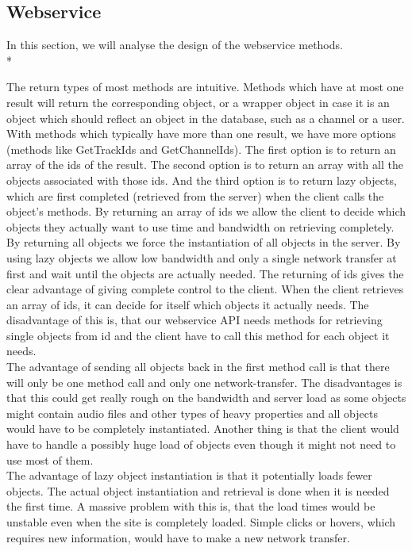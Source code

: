 \documentclass[a4paper,11pt,report]{article}
\begin{document}
\subsection{Webservice}
In this section, we will analyse the design of the webservice methods.  \\*

The return types of most methods are intuitive. Methods which have at most one result will return the corresponding object, or a wrapper object in case it is an object which should reflect an object in the database, such as a channel or a user. \\
With methods which typically have more than one result, we have more options (methods like GetTrackIds and GetChannelIds). 
The first option is to return an array of the ids of the result. The second option is to return an array with all the objects associated with those ids. And the third option is to return lazy objects, which are first completed (retrieved from the server) when the client calls the object's methods. By returning an array of ids we allow the client to decide which objects they actually want to use time and bandwidth on retrieving completely. By returning all objects we force the instantiation of all objects in the server. By using lazy objects we allow low bandwidth and only a single network transfer at first and wait until the objects are actually needed.
The returning of ids gives the clear advantage of giving complete control to the client. When the client retrieves an array of ids, it can decide for itself which objects it actually needs. The disadvantage of this is, that our webservice API needs methods for retrieving single objects from id and the client have to call this method for each object it needs. \\
The advantage of sending all objects back in the first method call is that there will only be one method call and only one network-transfer. The disadvantages is that this could get really rough on the bandwidth and server load as some objects might contain audio files and other types of heavy properties and all objects would have to be completely instantiated. Another thing is that the client would have to handle a possibly huge load of objects even though it might not need to use most of them. \\
The advantage of lazy object instantiation is that it potentially loads fewer objects. The actual object instantiation and retrieval is done when it is needed the first time. A massive problem with this is, that the load times would be unstable even when the site is completely loaded. Simple clicks or hovers, which requires new information, would have to make a new network transfer. \\
\end{document}

